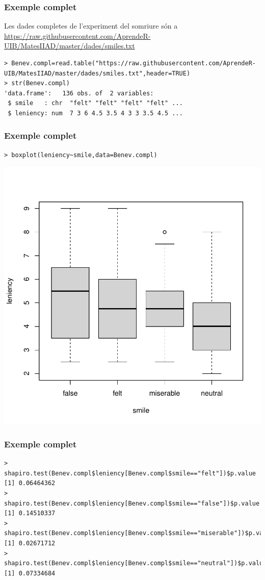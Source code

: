 \documentclass[12pt,t]{beamer}
\newcommand{\blue}[1]{\textcolor{blue}{#1}}
\theoremstyle{plain}
\theoremstyle{definition}
\begin{document}
\begin{frame}[fragile]
\frametitle{Exemple complet}

Les dades completes de l'experiment del somriure són a  \blue{\url{https://raw.githubusercontent.com/AprendeR-UIB/MatesIIAD/master/dades/smiles.txt}}\medskip


\begin{lstlisting}
> Benev.compl=read.table("https://raw.githubusercontent.com/AprendeR-UIB/MatesIIAD/master/dades/smiles.txt",header=TRUE)
> str(Benev.compl)
'data.frame':	136 obs. of  2 variables:
 $ smile   : chr  "felt" "felt" "felt" "felt" ...
 $ leniency: num  7 3 6 4.5 3.5 4 3 3 3.5 4.5 ...
\end{lstlisting}
\end{frame}



\begin{frame}[fragile]
\frametitle{Exemple complet}\vspace*{-1ex}

\begin{lstlisting}
> boxplot(leniency~smile,data=Benev.compl)
\end{lstlisting}\vspace*{-1ex}

\begin{center}
\includegraphics[width=0.8\linewidth]{boxplot}
\end{center}

\end{frame}


\begin{frame}[fragile]
\frametitle{Exemple complet}

\begin{lstlisting}
> shapiro.test(Benev.compl$leniency[Benev.compl$smile=="felt"])$p.value
[1] 0.06464362
> shapiro.test(Benev.compl$leniency[Benev.compl$smile=="false"])$p.value
[1] 0.14510337
> shapiro.test(Benev.compl$leniency[Benev.compl$smile=="miserable"])$p.value
[1] 0.02671712
> shapiro.test(Benev.compl$leniency[Benev.compl$smile=="neutral"])$p.value
[1] 0.07334684
\end{lstlisting}
\end{frame}
\end{document}
